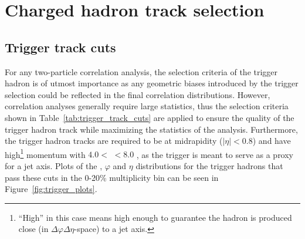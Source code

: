 \section{Charged hadron track selection}
\label{sec:track_selection}

\subsection{Trigger track cuts}

For any two-particle correlation analysis, the selection criteria of the trigger hadron is of utmost importance as any geometric biases introduced by the trigger selection could be reflected in the final correlation distributions. However, correlation analyses generally require large statistics, thus the selection criteria shown in Table~\ref{tab:trigger_track_cuts} are applied to ensure the quality of the trigger hadron track while maximizing the statistics of the analysis. Furthermore, the trigger hadron tracks are required to be at midrapidity ($|\eta| < 0.8$) and have high\footnote{``High'' in this case means high enough to guarantee the hadron is produced close (in $\Delta\varphi\Delta\eta$-space) to a jet axis.} momentum with $4.0 <$ \pttrig $< 8.0$ \GeVc, as the trigger is meant to serve as a proxy for a jet axis. Plots of the \pt, $\varphi$ and $\eta$ distributions for the trigger hadrons that pass these cuts in the 0-20\% multiplicity bin can be seen in Figure~\ref{fig:trigger_plots}.

